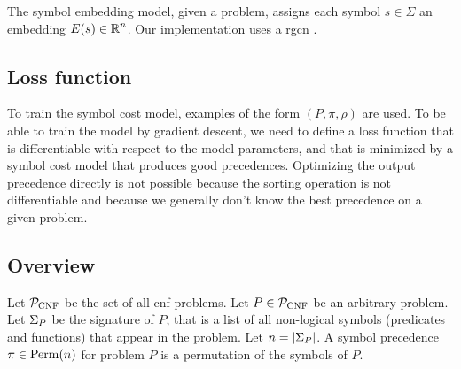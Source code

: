 The symbol embedding model, given a problem,
assigns each symbol $s \in \Sigma$ an embedding $E(s) \in \operatorname{\mathbb{R}}^n$.
Our implementation uses a \gls{rgcn} \cite{}.


\subsection{Loss function}

To train the symbol cost model,
examples of the form $(P, \pi, \rho)$ are used.
To be able to train the model by gradient descent,
we need to define a loss function that is differentiable with respect to the model parameters,
and that is minimized by a symbol cost model that produces good precedences.
Optimizing the output precedence directly is not possible
because the sorting operation is not differentiable
and because we generally don't know the best precedence on a given problem.


\newcommand{\Prec}{\pi}
\newcommand{\PrecBetter}{\pi}
\newcommand{\PrecWorse}{\rho}

\subsection{Overview}

Let $\operatorname{\mathcal{P}_{\mathrm{CNF}}}$ be the set of all \gls{cnf} problems.
Let $P \in \operatorname{\mathcal{P}_{\mathrm{CNF}}}$ be an arbitrary problem.
Let $\Sigma_P$ be the signature of $P$, that is a list of all non-logical symbols (predicates and functions)
that appear in the problem.
Let $n = \left|\Sigma_P\right|$.
A symbol precedence $\Prec \in \Perm{n}$ for problem $P$ is a permutation of the symbols of $P$.

\newcommand{\Solver}{S}
\newcommand{\SolverRun}[2]{\Solver(#1, #2)}

